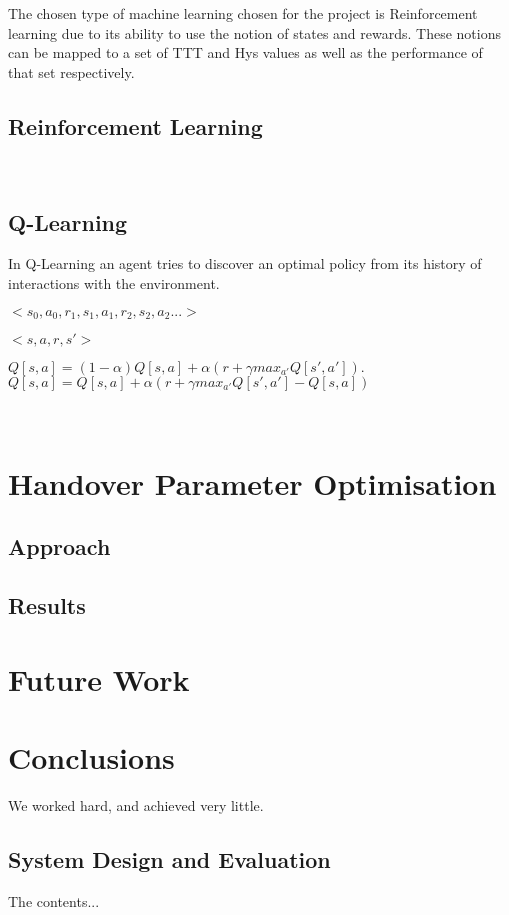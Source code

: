\documentclass[12pt, oneside]{report}
\begin{document}
The chosen type of machine learning chosen for the project is Reinforcement learning due to its ability to use the notion of states and rewards. These notions can be mapped to a set of TTT and Hys values as well as the performance of that set respectively.

\section{Reinforcement Learning}\label{reinforcement learning}
~\cite{barto1998reinforcement}
\section{Q-Learning}\label{qlearning}
In Q-Learning an agent tries to discover an optimal policy from its history of interactions with the environment.
\begin{center}
$<s_{0},a_{0},r_{1},s_{1},a_{1},r_{2},s_{2},a_{2}...>$
\end{center}

\begin{center}
$<s,a,r,s'>$
\end{center}

\begin{center}
$Q[s,a] = (1-\alpha) Q[s,a] + \alpha(r+ {\gamma}max_{a'} Q[s',a']).$
$Q[s,a] = Q[s,a] + {\alpha}(r+ {\gamma}max_{a'} Q[s',a'] - Q[s,a])$
\end{center}
~\cite{poole2010artificial}

\chapter{Handover Parameter Optimisation}\label{handover parameter optimisation}
\section{Approach}\label{approach}
\section{Results}\label{results}

\chapter{Future Work}\label{future work}

\chapter{Conclusions}\label{conclusion}
We worked hard, and achieved very little.

\pagebreak




\begin{appendices}
\chapter{System Design and Evaluation}
The contents...

%

\end{appendices}
\end{document}
